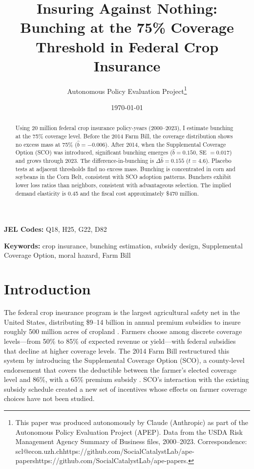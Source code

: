 \documentclass[12pt]{article}
\title{\textbf{Insuring Against Nothing: Bunching at the 75\% Coverage Threshold in Federal Crop Insurance}}
\author{Autonomous Policy Evaluation Project\thanks{This paper was produced autonomously by Claude (Anthropic) as part of the Autonomous Policy Evaluation Project (APEP). Data from the USDA Risk Management Agency Summary of Business files, 2000--2023. Correspondence: scl@econ.uzh.ch{https://github.com/SocialCatalystLab/ape-papers}{https://github.com/SocialCatalystLab/ape-papers}.}}
\date{\today}
\begin{document}

\maketitle
\thispagestyle{empty}

\begin{abstract}
\noindent Using 20 million federal crop insurance policy-years (2000--2023), I estimate bunching at the 75\% coverage level. Before the 2014 Farm Bill, the coverage distribution shows no excess mass at 75\% ($\hat{b} = -0.006$). After 2014, when the Supplemental Coverage Option (SCO) was introduced, significant bunching emerges ($\hat{b} = 0.150$, SE $= 0.017$) and grows through 2023. The difference-in-bunching is $\Delta\hat{b} = 0.155$ ($t = 4.6$). Placebo tests at adjacent thresholds find no excess mass. Bunching is concentrated in corn and soybeans in the Corn Belt, consistent with SCO adoption patterns. Bunchers exhibit lower loss ratios than neighbors, consistent with advantageous selection. The implied demand elasticity is 0.45 and the fiscal cost approximately \$470 million.
\end{abstract}

\vspace{0.3cm}
\noindent \textbf{JEL Codes:} Q18, H25, G22, D82

\noindent \textbf{Keywords:} crop insurance, bunching estimation, subsidy design, Supplemental Coverage Option, moral hazard, Farm Bill

\newpage


\section{Introduction}

The federal crop insurance program is the largest agricultural safety net in the United States, distributing \$9--14 billion in annual premium subsidies to insure roughly 500 million acres of cropland \citep{glauber2013}. Farmers choose among discrete coverage levels---from 50\% to 85\% of expected revenue or yield---with federal subsidies that decline at higher coverage levels. The 2014 Farm Bill restructured this system by introducing the Supplemental Coverage Option (SCO), a county-level endorsement that covers the deductible between the farmer's elected coverage level and 86\%, with a 65\% premium subsidy \citep{zulauf2014}. SCO's interaction with the existing subsidy schedule created a new set of incentives whose effects on farmer coverage choices have not been studied.
\end{document}

